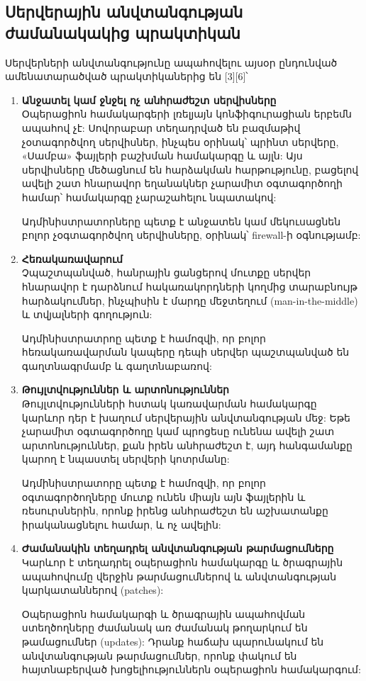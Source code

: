 \documentclass[a4paper,12pt]{article}
\begin{document}
\begin{sloppypar}
\subsection{Սերվերային անվտանգության ժամանակակից պրակտիկան}


Սերվերների անվտանգությունը ապահովելու այսօր ընդունված ամենատարածված
պրակտիկաներից են [3][6]՝

\begin{enumerate}
\item \textbf{Անջատել կամ ջնջել ոչ անհրաժեշտ սերվիսները}\\
    Օպերացիոն համակարգերի լռելյայն կոնֆիգուրացիան երբեմն ապահով չէ:
    Սովորաբար տեղադրված են բազմաթիվ չօտագործվող սերվիսներ, ինչպես
    օրինակ՝ պրինտ սերվերը, «Սամբա» ֆայլերի բաշխման համակարգը և այլն:
	Այս սերվիսները
    մեծացնում են հարձակման հարթությունը, բացելով ավելի շատ հնարավոր եղանակներ
    չարամիտ օգտագործողի համար՝ համակարգը չարաշահելու նպատակով:

    Ադմինիստրատորները պետք է անջատեն կամ մեկուսացնեն բոլոր չօգտագործվող
    սերվիսները, օրինակ՝ firewall-ի օգնությամբ:
\item \textbf{Հեռակառավարում}\\
    Չպաշտպանված, հանրային ցանցերով մուտքը սերվեր հնարավոր է դարձնում
    հակառակորդների կողմից տարաբնույթ հարձակումներ, ինչպիսին է
    մարդը մեջտեղում (man-in-the-middle) և տվյալների գողություն:

    Ադմինիստրատրոը պետք է համոզվի, որ բոլոր հեռակառավարման կապերը
    դեպի սերվեր պաշտպանված են գաղտնագրմամբ և գաղտնաբառով:
\item \textbf{Թույլտվություններ և արտոնություններ}\\
    Թույլտվությունների հստակ կառավարման համակարգը կարևոր դեր է խաղում
    սերվերային անվտանգության մեջ: Եթե չարամիտ օգտագործողը կամ պրոցեսը
    ունենա ավելի շատ արտոնություններ, քան իրեն անհրաժեշտ է, այդ հանգամանքը
    կարող է նպաստել սերվերի կոտրմանը:

    Ադմինիստրատորը պետք է համոզվի, որ բոլոր օգտագործողները մուտք ունեն
    միայն այն ֆայլերին և ռեսուրսներին, որոնք իրենց անհրաժեշտ են
    աշխատանքը իրականացնելու համար, և ոչ ավելին:
\item \textbf{Ժամանակին տեղադրել անվտանգության թարմացումները}\\
    Կարևոր է տեղադրել օպերացիոն համակարգը և ծրագրային ապահովումը
    վերջին թարմացումներով և անվտանգության կարկատաններով (patches):

	Օպերացիոն համակարգի և ծրագրային ապահովման ստեղծողները ժամանակ
	առ ժամանակ թողարկում են թամացումներ (updates):
	Դրանք հաճախ պարունակում են անվտանգության թարմացումներ, որոնք
	փակում են հայտնաբերված խոցելիություններն օպերացիոն համակարգում:


\end{enumerate}
\end{sloppypar}
\end{document}
